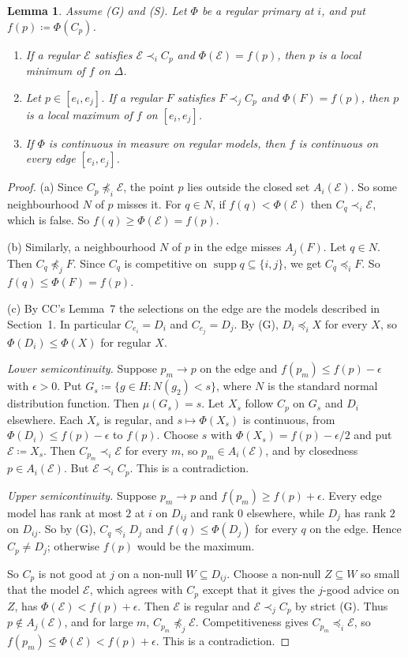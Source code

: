 \documentclass[11pt]{article}
\newtheorem{lemma}[theorem]{Lemma}
\theoremstyle{remark}\newtheorem{remark}[theorem]{Remark}
\newcommand{\Escr}{\mathcal E}
\newcommand{\supp}{\operatorname{supp}}
\begin{document}
\begin{lemma}\label{lem:regular-primary}
Assume (G) and (S). Let $\Phi$ be a regular primary at $i$, and put
$f(p)\coloneqq\Phi(C_p)$.
\begin{enumerate}[label=(\alph*)]
\item If a regular $\Escr$ satisfies $\Escr\prec_iC_p$ and $\Phi(\Escr)=f(p)$,
then $p$ is a local minimum of $f$ on $\Delta$.
\item Let $p\in[e_i,e_j]$. If a regular $F$ satisfies $F\prec_jC_p$ and
$\Phi(F)=f(p)$, then $p$ is a local maximum of $f$ on $[e_i,e_j]$.
\item If $\Phi$ is continuous in measure on regular models, then $f$ is
continuous on every edge $[e_i,e_j]$.
\end{enumerate}
\end{lemma}
\begin{proof}
(a) Since $C_p\not\preceq_i\Escr$, the point $p$ lies outside the closed set
$A_i(\Escr)$. So some neighbourhood $N$ of $p$ misses it. For $q\in N$, if
$f(q)<\Phi(\Escr)$ then $C_q\prec_i\Escr$, which is false. So
$f(q)\ge\Phi(\Escr)=f(p)$.

(b) Similarly, a neighbourhood $N$ of $p$ in the edge misses $A_j(F)$. Let
$q\in N$. Then $C_q\not\preceq_jF$. Since $C_q$ is competitive on
$\supp q\subseteq\{i,j\}$, we get $C_q\preceq_iF$. So $f(q)\le\Phi(F)=f(p)$.

(c) By CC's Lemma~7 the selections on the edge are the models described in
Section~1. In particular $C_{e_i}=D_i$ and $C_{e_j}=D_j$. By (G),
$D_i\preceq_iX$ for every $X$, so $\Phi(D_i)\le\Phi(X)$ for regular $X$.

\emph{Lower semicontinuity.} Suppose $p_m\to p$ on the edge and
$f(p_m)\le f(p)-\epsilon$ with $\epsilon>0$. Put
$G_s\coloneqq\{g\in H:N(g_2)<s\}$, where $N$ is the standard normal
distribution function. Then $\mu(G_s)=s$. Let $X_s$ follow $C_p$ on $G_s$
and $D_i$ elsewhere. Each $X_s$ is regular, and $s\mapsto\Phi(X_s)$ is
continuous, from $\Phi(D_i)\le f(p)-\epsilon$ to $f(p)$. Choose $s$ with
$\Phi(X_s)=f(p)-\epsilon/2$ and put $\Escr\coloneqq X_s$. Then
$C_{p_m}\prec_i\Escr$ for every $m$, so $p_m\in A_i(\Escr)$, and by
closedness $p\in A_i(\Escr)$. But $\Escr\prec_iC_p$. This is a contradiction.

\emph{Upper semicontinuity.} Suppose $p_m\to p$ and
$f(p_m)\ge f(p)+\epsilon$. Every edge model has rank at most $2$ at $i$ on
$D_{ij}$ and rank $0$ elsewhere, while $D_j$ has rank $2$ on $D_{ij}$. So by
(G), $C_q\preceq_iD_j$ and $f(q)\le\Phi(D_j)$ for every $q$ on the edge.
Hence $C_p\ne D_j$; otherwise $f(p)$ would be the maximum.

So $C_p$ is not good at $j$ on a non-null $W\subseteq D_{ij}$. Choose a
non-null $Z\subseteq W$ so small that the model $\Escr$, which agrees with $C_p$
except that it gives the $j$-good advice on $Z$, has
$\Phi(\Escr)<f(p)+\epsilon$. Then $\Escr$ is regular and $\Escr\prec_jC_p$ by
strict (G). Thus $p\notin A_j(\Escr)$, and for large $m$,
$C_{p_m}\not\preceq_j\Escr$. Competitiveness gives $C_{p_m}\preceq_i\Escr$, so
$f(p_m)\le\Phi(\Escr)<f(p)+\epsilon$. This is a contradiction.
\end{proof}
\end{document}
